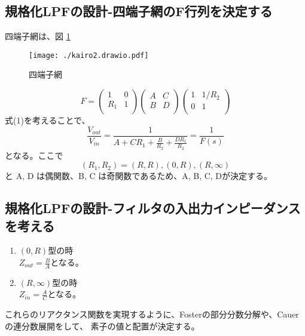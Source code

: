 \documentclass[a4j,twocolumn]{jsarticle}
\begin{document}
\subsection{規格化LPFの設計-四端子網のF行列を決定する}
四端子網は、図 \ref{F}
\begin{figure}[H]
    \centering
   \texttt{[image: ./kairo2.drawio.pdf]}
   \caption{四端子網}
    \label{F}
\end{figure}
\begin{equation}
F = 
\left(\begin{array}{cc} 1 & 0 \\ R_{1} & 1 \\ \end{array} \right) 
\left(\begin{array}{cc} A & C \\ B & D \\ \end{array} \right) 
\left(\begin{array}{cc} 1 & 1/R_{2} \\ 0 & 1 \\ \end{array} \right) 
\end{equation}
式(1)を考えることで、
\begin{equation}
\frac{V_{out}}{V_{in}} = \frac{1}{A+CR_{1}+\frac{B}{R_{2}}+\frac{DR_{1}}{R_{2}}} = \frac{1}{F(s)}
\end{equation}
となる。ここで
\begin{equation}
(R_{1}, R_{2}) = (R, R), (0, R), (R, \infty)
\end{equation}
と A, D は偶関数、B, C は奇関数であるため、A, B, C, Dが決定する。

\subsection{規格化LPFの設計-フィルタの入出力インピーダンスを考える}
\begin{enumerate}
\item $(0, R)$型の時 \\
$Z_{out} = \frac{B}{A}$となる。
\item $(R, \infty)$型の時 \\
$Z_{in} = \frac{A}{C}$となる。
\end{enumerate}
これらのリアクタンス関数を実現するように、Fosterの部分分数分解や、Cauerの連分数展開をして、
素子の値と配置が決定する。
\end{document}
